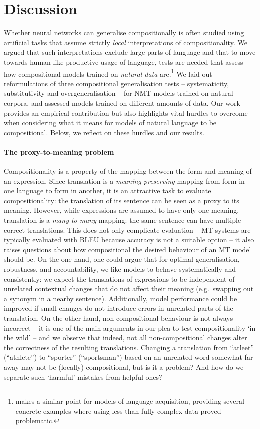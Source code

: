 \section{Discussion}\label{sec:discussion}

Whether neural networks can generalise compositionally is often studied using artificial tasks that assume strictly \emph{local} interpretations of compositionality.
We argued that such interpretations exclude large parts of language and that to move towards human-like productive usage of language, tests are needed that assess how compositional models trained on \emph{natural data} are.\footnote{\citet{dupoux2018cognitive} makes a similar point for models of language acquisition, providing several concrete examples where using less than fully complex data proved problematic.}
We laid out reformulations of three compositional generalisation tests -- systematicity, substitutivity and overgeneralisation -- for NMT models trained on natural corpora, and assessed models trained on different amounts of data.
Our work provides an empirical contribution but also highlights vital hurdles to overcome when considering what it means for models of natural language to be compositional.
Below, we reflect on these hurdles and our results.

\paragraph{The proxy-to-meaning problem}
Compositionality is a property of the mapping between the form and meaning of an expression.
Since translation is a \emph{meaning-preserving} mapping from form in one language to form in another, it is an attractive task to evaluate compositionality: the translation of its sentence can be seen as a proxy to its meaning.
However, while expressions are assumed to have only one meaning, translation is a \emph{many-to-many} mapping: the same sentence can have multiple correct translations.
This does not only complicate evaluation -- MT systems are typically evaluated with BLEU because accuracy is not a suitable option -- it also raises questions about how compositional the desired behaviour of an MT model should be.
On the one hand, one could argue that for optimal generalisation, robustness, and accountability, we like models to behave systematically and consistently: we expect the translations of expressions to be independent of unrelated contextual changes that do not affect their meaning (e.g.\ swapping out a synonym in a nearby sentence).
Additionally, model performance could be improved if small changes do not introduce errors in unrelated parts of the translation.
On the other hand, non-compositional behaviour is not always incorrect -- it is one of the main arguments in our plea to test compositionality `in the wild' -- and we observe that indeed, not all non-compositional changes alter the correctness of the resulting translations.
Changing a translation from ``atleet'' (``athlete'') to ``sporter'' (``sportsman'') based on an unrelated word somewhat far away may not be (locally) compositional, but is it a problem?
And how do we separate such `harmful' mistakes from helpful ones?

